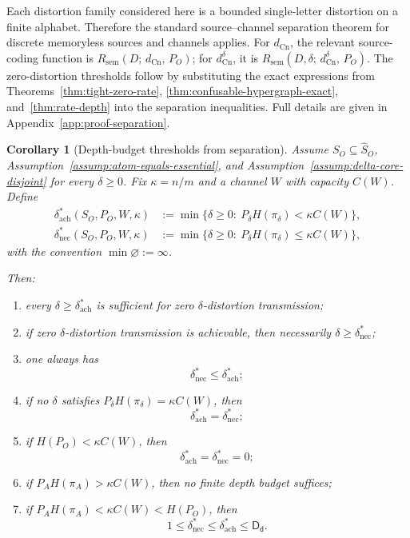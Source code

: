\documentclass[journal,onecolumn]{IEEEtran}
\makeatletter
\newcommand{\Cn}{\text{Cn}}
\newtheorem{corollary}{Corollary}[section]
\numberwithin{equation}{section}
\renewenvironment{proof}[1][\proofname]{\par
  \pushQED{\qed}%
  \normalfont \topsep6\p@\@plus6\p@\relax
  \trivlist
  \item[\hskip\labelsep
        \itshape
    #1\@addpunct{.}]\ignorespaces
}{%
  \popQED\endtrivlist\@endpefalse
}
\makeatother
\begin{document}
\begin{proof}[Proof sketch]
Each distortion family considered here is a bounded single-letter
distortion on a finite alphabet. Therefore the standard
source--channel separation theorem for discrete memoryless sources and
channels applies.
For \(d_{\Cn}\), the relevant source-coding function is
\(R_{\mathrm{sem}}(D;\,d_{\Cn},\,P_O)\); for
\(d_{\Cn}^{\delta}\), it is
\(R_{\mathrm{sem}}(D,\delta;\,d_{\Cn}^{\delta},\,P_O)\).
The zero-distortion thresholds follow by substituting the exact
expressions from Theorems~\ref{thm:tight-zero-rate},
\ref{thm:confusable-hypergraph-exact}, and~\ref{thm:rate-depth}
into the separation inequalities.
Full details are given in Appendix~\ref{app:proof-separation}.
\end{proof}

\begin{corollary}[Depth-budget thresholds from separation]
\label{cor:semantic-nyquist}
Assume \(S_O\subseteq\hat S_O\),
Assumption~\ref{assump:atom-equals-essential}, and
Assumption~\ref{assump:delta-core-disjoint} for every \(\delta\ge 0\).
Fix \(\kappa=n/m\) and a channel \(W\) with capacity \(C(W)\). Define
\begin{align}
  \delta_{\mathrm{ach}}^*(S_O,P_O,W,\kappa)
  &:=
  \min\{\delta\ge 0:\ P_\delta H(\pi_\delta)<\kappa C(W)\},
  \label{eq:min-depth-ach}\\
  \delta_{\mathrm{nec}}^*(S_O,P_O,W,\kappa)
  &:=
  \min\{\delta\ge 0:\ P_\delta H(\pi_\delta)\le\kappa C(W)\},
  \label{eq:min-depth-nec}
\end{align}
with the convention \(\min\varnothing:=\infty\).

Then:
\begin{enumerate}[label=\textup{(\roman*)}]
  \item every \(\delta\ge \delta_{\mathrm{ach}}^*\) is sufficient for
        zero \(\delta\)-distortion transmission;
  \item if zero \(\delta\)-distortion transmission is achievable, then
        necessarily \(\delta\ge \delta_{\mathrm{nec}}^*\);
  \item one always has
        \[
          \delta_{\mathrm{nec}}^*
          \le
          \delta_{\mathrm{ach}}^*;
        \]
  \item if no \(\delta\) satisfies
        \(P_\delta H(\pi_\delta)=\kappa C(W)\), then
        \[
          \delta_{\mathrm{ach}}^*
          =
          \delta_{\mathrm{nec}}^*;
        \]
  \item if \(H(P_O)<\kappa C(W)\), then
        \[
          \delta_{\mathrm{ach}}^*=\delta_{\mathrm{nec}}^*=0;
        \]
  \item if \(P_AH(\pi_A)>\kappa C(W)\), then no finite depth budget
        suffices;
  \item if \(P_AH(\pi_A)<\kappa C(W)< H(P_O)\), then
        \[
          1\le \delta_{\mathrm{nec}}^*
          \le \delta_{\mathrm{ach}}^*
          \le \mathsf{D_d}.
        \]
\end{enumerate}
\end{corollary}
\end{document}
